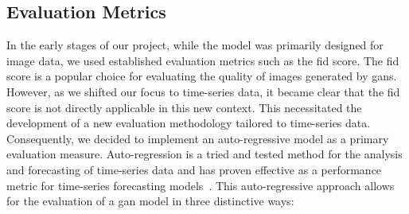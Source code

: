 \subsection{Evaluation Metrics}
In the early stages of our project, while the model was primarily designed for image data, we used established evaluation metrics such as the \gls*{fid} score. The \gls{fid} score is a popular choice for evaluating the quality of images generated by \glspl*{gan}. However, as we shifted our focus to time-series data, it became clear that the \gls{fid} score is not directly applicable in this new context. This necessitated the development of a new evaluation methodology tailored to time-series data.
\\
Consequently, we decided to implement an auto-regressive model as a primary evaluation measure. Auto-regression is a tried and tested method for the analysis and forecasting of time-series data and has proven effective as a performance metric for time-series forecasting models~\cite{rnntimeseries}. This auto-regressive approach allows for the evaluation of a \gls*{gan} model in three distinctive ways:



